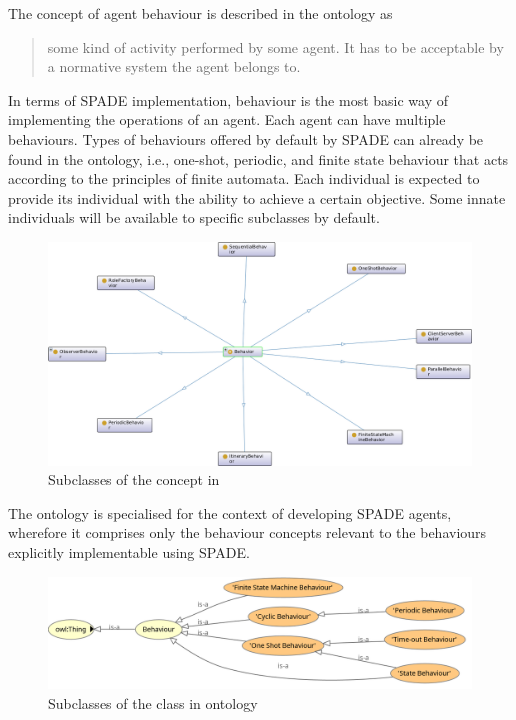  The concept of agent behaviour is described in the  ontology as \blockquote{\textelp{} some kind of activity performed by some agent. It has to be acceptable by a normative system the agent belongs to.} In terms of SPADE implementation, behaviour is the most basic way of implementing the operations of an agent. Each agent can have multiple behaviours. Types of behaviours offered by default by SPADE can already be found in the  ontology,
%
i.e., one-shot, periodic, and finite state behaviour that acts according to the principles of finite automata. Each  individual is expected to provide its  individual with the ability to achieve a certain objective. Some innate  individuals will be available to specific  subclasses by default.

\begin{figure}
    \centering
    \includegraphics[width=0.84\linewidth]{Deliverables/Phase 1/Figures/Behaviours in ooooaflsmas.png}
    \caption{Subclasses of the  concept in }
    \label{fig: behaviour subclasses in ooooaflsmas}
\end{figure}

The \magoontologyname ontology is specialised for the context of developing \ac{SPADE} agents, wherefore it comprises only the behaviour concepts relevant to the behaviours explicitly implementable using \ac{SPADE}.

\begin{figure}
    \centering
    \includegraphics[width=1\linewidth]{Deliverables/Phase 1/Figures/behaviour subclasses.png}
    \caption{Subclasses of the class  in \magoontologyname ontology}
    \label{fig: behaviour subclasses in MAGO}
\end{figure}


